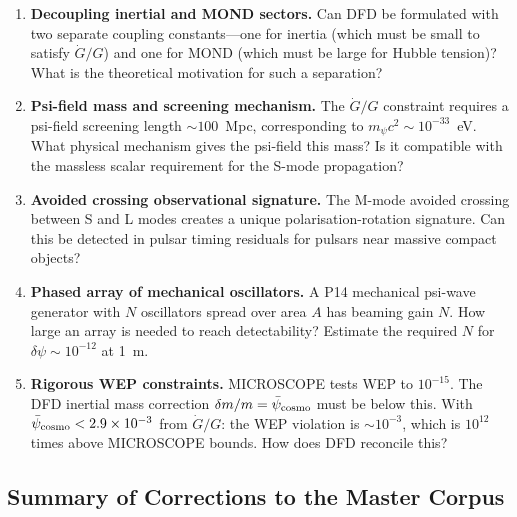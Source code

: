\documentclass[11pt]{article}
\newcommand{\ee}[1]{\times 10^{#1}}
\newcommand{\psibar}{\bar{\psi}}
\begin{document}
\begin{enumerate}[leftmargin=*]

\item \textbf{Decoupling inertial and MOND sectors.}
  Can DFD be formulated with two separate coupling constants---one for inertia
  (which must be small to satisfy $\dot{G}/G$) and one for MOND (which must be
  large for Hubble tension)? What is the theoretical motivation for such a
  separation?

\item \textbf{Psi-field mass and screening mechanism.}
  The $\dot{G}/G$ constraint requires a psi-field screening length $\sim 100$~Mpc,
  corresponding to $m_\psi c^2 \sim 10^{-33}$~eV. What physical mechanism gives
  the psi-field this mass? Is it compatible with the massless scalar requirement
  for the S-mode propagation?

\item \textbf{Avoided crossing observational signature.}
  The M-mode avoided crossing between S and L modes creates a unique
  polarisation-rotation signature. Can this be detected in pulsar timing
  residuals for pulsars near massive compact objects?

\item \textbf{Phased array of mechanical oscillators.}
  A P14 mechanical psi-wave generator with $N$ oscillators spread over area $A$
  has beaming gain $N$. How large an array is needed to reach detectability?
  Estimate the required $N$ for $\delta\psi \sim 10^{-12}$ at 1~m.

\item \textbf{Rigorous WEP constraints.}
  MICROSCOPE tests WEP to $10^{-15}$. The DFD inertial mass correction
  $\delta m/m = \psibar_{\rm cosmo}$ must be below this. With
  $\psibar_{\rm cosmo} < 2.9\ee{-3}$ from $\dot{G}/G$: the WEP violation is
  $\sim 10^{-3}$, which is $10^{12}$ times above MICROSCOPE bounds.
  How does DFD reconcile this?

\end{enumerate}

\subsection*{Summary of Corrections to the Master Corpus}
\end{document}
